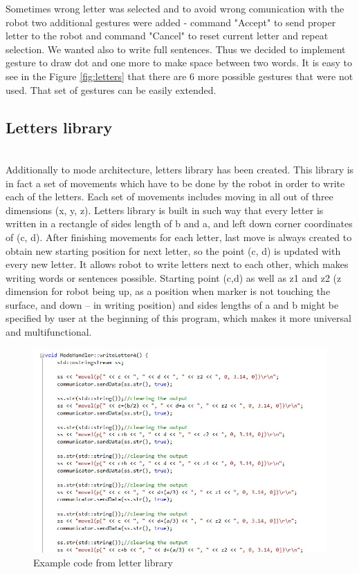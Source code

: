 Sometimes wrong letter was selected and to avoid wrong comunication with the robot two additional gestures were added - command "Accept" to send proper letter to the robot and command "Cancel" to reset current letter and repeat selection. We wanted also to write full sentences. Thus we decided to implement gesture to draw dot and one more to make space between two words. It is easy to see in the Figure \ref{fig:letters} that there are 6 more possible gestures that were not used. That set of gestures can be easily extended. 

\subsection{Letters library}

\mbox{}\\

Additionally to mode architecture, letters library has been created. This library is in fact a set of movements which have to be done by the robot in order to write each of the letters. Each set of movements includes moving in all out of three dimensions (x, y, z). Letters library is built in such way that every letter is written in a rectangle of sides length of b and a, and left down corner coordinates of (c, d). After finishing movements for each letter, last move is always created to obtain new starting position for next letter, so the point (c, d) is updated with every new letter. It allows robot to write letters next to each other, which makes writing words or sentences possible. Starting point (c,d) as well as z1 and z2 (z dimension for robot being up, as a position when marker is not touching the surface, and down – in writing position) and sides lengths of a and b might be specified by user at the beginning of this program, which makes it more universal and multifunctional.\\

\begin{figure}[H]
	\includegraphics[scale=0.8]{Aletter}
	\centering
	\caption{Example code from letter library}
	\label{fig:Aletter}
\end{figure}

